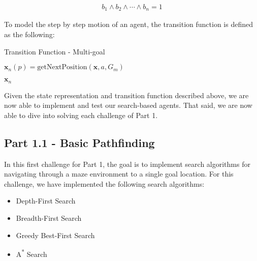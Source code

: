 \documentclass{article}[12pt]
\begin{document}
   \begin{align*}
   b_1 \wedge b_2 \wedge \cdots \wedge b_n = 1
   \end{align*}
   
   To model the step by step motion of an agent, the transition function is defined as the following:
   
	\begin{algorithm}[H]
	\caption{Transition Function - Multi-goal }
		 \;
		 
		 \;
		 
		 $\boldsymbol{x}_n(p) = \text{getNextPosition}\left(\boldsymbol{x},a,G_m\right)$
		 \;
		 \;
		 
		 \;
		 \Return $\boldsymbol{x}_n$
	\end{algorithm}
	
	Given the state representation and transition function described above, we are now able to implement and test our search-based agents. That said, we are now able to dive into solving each challenge of Part 1.
	
	\subsection{Part 1.1 - Basic Pathfinding}
   In this first challenge for Part 1, the goal is to implement search algorithms for navigating through a maze environment to a single goal location. For this challenge, we have implemented the following search algorithms:
   
   \begin{itemize}
   \item Depth-First Search
   \item Breadth-First Search
   \item Greedy Best-First Search
   \item A\textsuperscript{*} Search
   \end{itemize}
   
\end{document}
